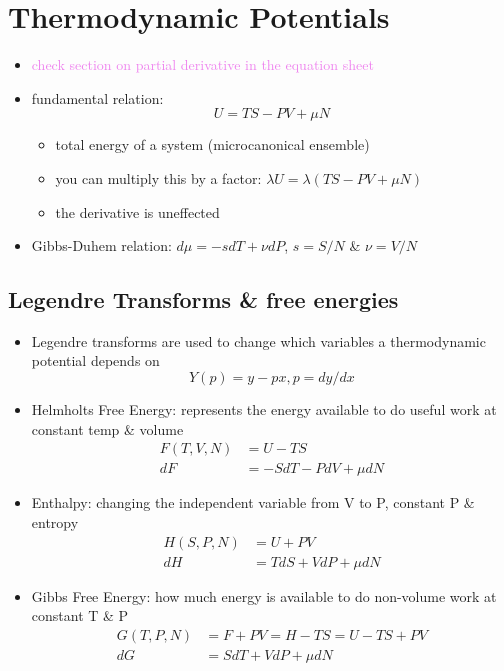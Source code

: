 
\section{Thermodynamic Potentials}


\begin{itemize}
	\item \textcolor{violet}{check section on partial derivative in the equation sheet}
	\item fundamental relation:
	      \begin{equation}
		      U = TS - PV + \mu N
	      \end{equation}
	      \begin{itemize}
		      \item total energy of a system (microcanonical ensemble)
		      \item you can multiply this by a factor: $\lambda U = \lambda (TS - PV + \mu N)$
		      \item the derivative is uneffected
	      \end{itemize}
	\item Gibbs-Duhem relation: $d\mu = -s dT + \nu dP$, $s = S/N$ \& $\nu = V/N$
\end{itemize}

\subsection{Legendre Transforms \& free energies}
\begin{itemize}
	\item Legendre transforms are used to change which variables a thermodynamic potential depends on
	      \begin{equation*}
		      Y(p) = y - px, p = dy/dx
	      \end{equation*}
	\item Helmholts Free Energy: represents the energy available to do useful work at constant temp \& volume
	      \begin{align*}
		      F(T,V, N) & = U - TS                \\
		      dF        & = -S dT - P dV + \mu dN
	      \end{align*}

	\item Enthalpy: changing the independent variable from V to P, constant P \& entropy
	      \begin{align*}
		      H(S, P, N) & = U + PV               \\
		      dH         & = T dS + V dP + \mu dN
	      \end{align*}

	\item Gibbs Free Energy: how much energy is available to do non-volume work at constant T \& P
	      \begin{align*}
		      G(T, P, N) & = F + PV = H - TS = U -TS + PV \\
		      dG         & = S dT + V dP + \mu dN
	      \end{align*}

\end{itemize}

